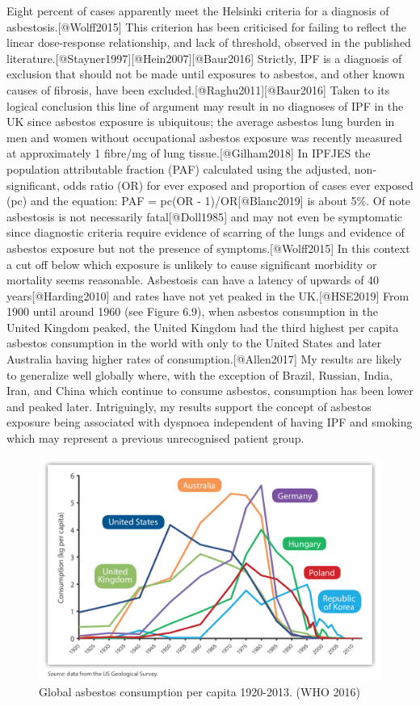 Eight percent of cases apparently meet the Helsinki criteria for a
diagnosis of asbestosis.{[}@Wolff2015{]} This criterion has been
criticised for failing to reflect the linear dose-response relationship,
and lack of threshold, observed in the published
literature.{[}@Stayner1997{]}{[}@Hein2007{]}{[}@Baur2016{]} Strictly,
IPF is a diagnosis of exclusion that should not be made until exposures
to asbestos, and other known causes of fibrosis, have been
excluded.{[}@Raghu2011{]}{[}@Baur2016{]} Taken to its logical conclusion
this line of argument may result in no diagnoses of IPF in the UK since
asbestos exposure is ubiquitous; the average asbestos lung burden in men
and women without occupational asbestos exposure was recently measured
at approximately 1 fibre/mg of lung tissue.{[}@Gilham2018{]} In IPFJES
the population attributable fraction (PAF) calculated using the
adjusted, non-significant, odds ratio (OR) for ever exposed and
proportion of cases ever exposed (pc) and the equation: PAF = pc(OR -
1)/OR{[}@Blanc2019{]} is about 5\%. Of note asbestosis is not
necessarily fatal{[}@Doll1985{]} and may not even be symptomatic since
diagnostic criteria require evidence of scarring of the lungs and
evidence of asbestos exposure but not the presence of
symptoms.{[}@Wolff2015{]} In this context a cut off below which exposure
is unlikely to cause significant morbidity or mortality seems
reasonable. Asbestosis can have a latency of upwards of 40
years{[}@Harding2010{]} and rates have not yet peaked in the
UK.{[}@HSE2019{]} From 1900 until around 1960 (see Figure 6.9), when
asbestos consumption in the United Kingdom peaked, the United Kingdom
had the third highest per capita asbestos consumption in the world with
only to the United States and later Australia having higher rates of
consumption.{[}@Allen2017{]} My results are likely to generalize well
globally where, with the exception of Brazil, Russian, India, Iran, and
China which continue to consume asbestos, consumption has been lower and
peaked later. Intriguingly, my results support the concept of asbestos
exposure being associated with dyspnoea independent of having IPF and
smoking which may represent a previous unrecognised patient group.

\begin{figure}
\centering
\includegraphics{source/figures/asbestos_consumption.png}
\caption{Global asbestos consumption per capita 1920-2013. (WHO 2016)}
\end{figure}

